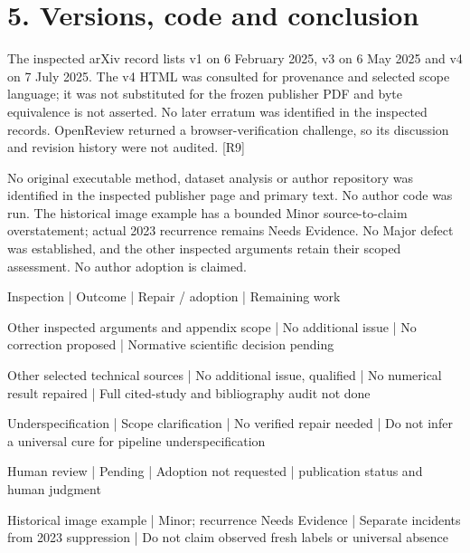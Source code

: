 \documentclass[10pt]{article}
\begin{document}
\section*{5. Versions, code and conclusion}
The inspected arXiv record lists v1 on 6 February 2025, v3 on 6 May 2025 and v4 on 7 July 2025. The v4 HTML was consulted for provenance and selected scope language; it was not substituted for the frozen publisher PDF and byte equivalence is not asserted. No later erratum was identified in the inspected records. OpenReview returned a browser-verification challenge, so its discussion and revision history were not audited. [R9]\par
No original executable method, dataset analysis or author repository was identified in the inspected publisher page and primary text. No author code was run. The historical image example has a bounded Minor source-to-claim overstatement; actual 2023 recurrence remains Needs Evidence. No Major defect was established, and the other inspected arguments retain their scoped assessment. No author adoption is claimed.\par
Inspection | Outcome | Repair / adoption | Remaining work\par
Other inspected arguments and appendix scope | No additional issue | No correction proposed | Normative scientific decision pending\par
Other selected technical sources | No additional issue, qualified | No numerical result repaired | Full cited-study and bibliography audit not done\par
Underspecification | Scope clarification | No verified repair needed | Do not infer a universal cure for pipeline underspecification\par
Human review | Pending | Adoption not requested | publication status and human judgment\par
Historical image example | Minor; recurrence Needs Evidence | Separate incidents from 2023 suppression | Do not claim observed fresh labels or universal absence\par
\end{document}

